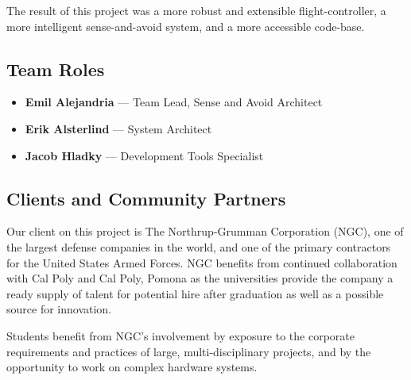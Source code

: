 \documentclass[12pt]{article}
\begin{document}
The result of this project was a more robust and extensible flight-controller, a more intelligent sense-and-avoid system, and a more accessible code-base.

\subsection{Team Roles}

\begin{itemize}
\item \textbf{Emil Alejandria} --- Team Lead, Sense and Avoid Architect
  \item \textbf{Erik Alsterlind} --- System Architect
  \item \textbf{Jacob Hladky}  --- Development Tools Specialist
\end{itemize}

\subsection{Clients and Community Partners}
Our client on this project is The Northrup-Grumman Corporation (NGC), one of the largest defense companies in the world, and one of the primary contractors for the United States Armed Forces. NGC benefits from continued collaboration with Cal Poly and Cal Poly, Pomona as the universities provide the company a ready supply of talent for potential hire after graduation as well as a possible source for innovation.

Students benefit from NGC's involvement by exposure to the corporate requirements and practices of large, multi-disciplinary projects, and by the opportunity to work on complex hardware systems.
\end{document}
